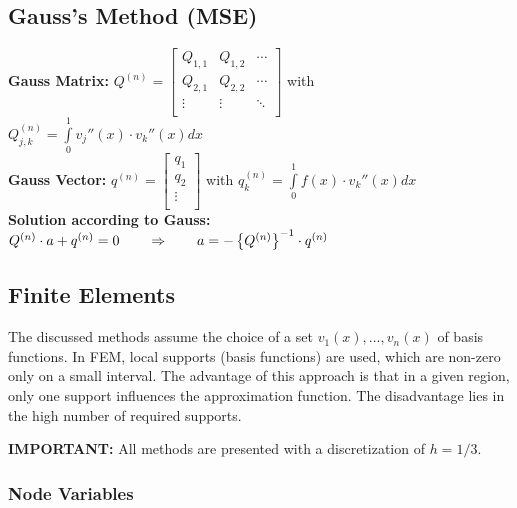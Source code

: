 \subsection{Gauss's Method (MSE)}

\textbf{Gauss Matrix: }
$Q^{(n)}=\begin{bmatrix}
	Q_{1,1}& Q_{1,2}&\cdots\\
	Q_{2,1}& Q_{2,2}&\cdots\\
	\vdots & \vdots &\ddots\\
\end{bmatrix}$ \qquad with \qquad $Q_{j,k}^{(n)}=\int\limits_{0}^{1}{v_j''(x)\cdot v_k''(x) dx}$\\
\textbf{Gauss Vector: }
$q^{(n)}=\begin{bmatrix}
	q_1\\
	q_2\\
	\vdots\\
\end{bmatrix}$ \qquad with \qquad $q_{k}^{(n)}=\int\limits_{0}^{1}{f(x)\cdot v_k''(x) dx}$\\

\textbf{Solution according to Gauss:}
$Q^{(n)}\cdot a+q^{(n)}=0\qquad \Rightarrow \qquad a=\textcolor{red}{\mathbf{-}}\left\{Q^{(n)}\right\}^{-1}\cdot q^{(n)}$

\subsection{Finite Elements}

The discussed methods assume the choice of a set $v_1(x),\ldots,v_n(x)$ of basis functions.
In FEM, local supports (basis functions) are used, which are non-zero only on a small interval.
The advantage of this approach is that in a given region,
only one support influences the approximation function.
The disadvantage lies in the high number of required supports.

\textbf{IMPORTANT:} All methods are presented with a discretization of $h=1/3$.

\subsubsection{Node Variables}

